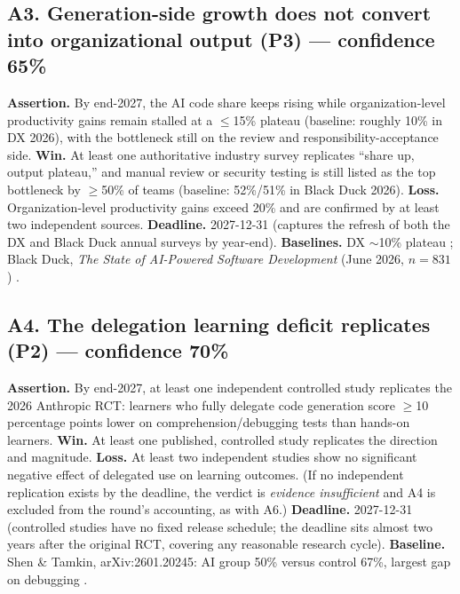 \documentclass[11pt]{article}
\begin{document}
\subsection*{A3. Generation-side growth does not convert into
organizational output (P3) --- confidence 65\%}
\textbf{Assertion.} By end-2027, the AI code share keeps rising while
organization-level productivity gains remain stalled at a $\leq$15\%
plateau (baseline: roughly 10\% in DX 2026), with the bottleneck still on
the review and responsibility-acceptance side. \textbf{Win.} At least one
authoritative industry survey replicates ``share up, output plateau,''
and manual review or security testing is still listed as the top
bottleneck by $\geq$50\% of teams (baseline: 52\%/51\% in Black Duck
2026). \textbf{Loss.} Organization-level productivity gains exceed 20\%
and are confirmed by at least two independent sources. \textbf{Deadline.}
2027-12-31 (captures the refresh of both the DX and Black Duck annual
surveys by year-end). \textbf{Baselines.} DX $\sim$10\% plateau
\cite{dx}; Black Duck, \emph{The State of AI-Powered Software
Development} (June 2026, $n=831$) \cite{blackduck}.

\subsection*{A4. The delegation learning deficit replicates (P2) ---
confidence 70\%}
\textbf{Assertion.} By end-2027, at least one independent controlled study
replicates the 2026 Anthropic RCT: learners who fully delegate code
generation score $\geq$10 percentage points lower on
comprehension/debugging tests than hands-on learners. \textbf{Win.} At
least one published, controlled study replicates the direction and
magnitude. \textbf{Loss.} At least two independent studies show no
significant negative effect of delegated use on learning outcomes. (If no
independent replication exists by the deadline, the verdict is
\emph{evidence insufficient} and A4 is excluded from the round's
accounting, as with A6.)
\textbf{Deadline.} 2027-12-31 (controlled studies have no fixed release
schedule; the deadline sits almost two years after the original RCT,
covering any reasonable research cycle).
\textbf{Baseline.} Shen \& Tamkin, arXiv:2601.20245: AI group 50\% versus
control 67\%, largest gap on debugging \cite{anthropic_rct}.
\end{document}
